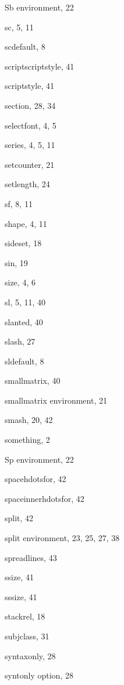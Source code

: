 \begin{theindex}
  \item {\ptt {}Sb} environment, 22
  \item {\ptt \bslash sc}, 5, 11
  \item {\ptt \bslash scdefault}, 8
  \item {\ptt \bslash scriptscriptstyle}, 41
  \item {\ptt \bslash scriptstyle}, 41
  \item {\ptt \bslash section}, 28, 34
  \item {\ptt \bslash selectfont}, 4, 5
  \item {\ptt \bslash series}, 4, 5, 11
  \item {\ptt \bslash setcounter}, 21
  \item {\ptt \bslash setlength}, 24
  \item {\ptt \bslash sf}, 8, 11
  \item {\ptt \bslash shape}, 4, 11
  \item {\ptt \bslash sideset}, 18
  \item {\ptt \bslash sin}, 19
  \item {\ptt \bslash size}, 4, 6
  \item {\ptt \bslash sl}, 5, 11, 40
  \item {\ptt \bslash slanted}, 40
  \item {\ptt \bslash slash}, 27
  \item {\ptt \bslash sldefault}, 8
  \item {\ptt \bslash smallmatrix}, 40
  \item {\ptt {}smallmatrix} environment, 21
  \item {\ptt \bslash smash}, 20, 42
  \item {\ptt \bslash something}, 2
  \item {\ptt {}Sp} environment, 22
  \item {\ptt \bslash spacehdotsfor}, 42
  \item {\ptt \bslash spaceinnerhdotsfor}, 42
  \item {\ptt \bslash split}, 42
  \item {\ptt {}split} environment, 23, 25, 27, 38
  \item {\ptt \bslash spreadlines}, 43
  \item {\ptt \bslash ssize}, 41
  \item {\ptt \bslash sssize}, 41
  \item {\ptt \bslash stackrel}, 18
  \item {\ptt \bslash subjclass}, 31
  \item {\ptt \bslash syntaxonly}, 28
  \item {\ptt {}syntonly} option, 28


\end{theindex}
